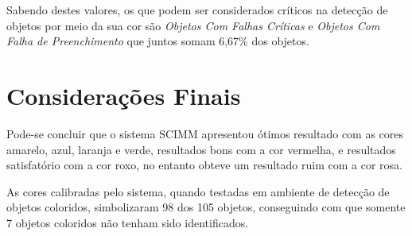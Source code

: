 	
	Sabendo destes valores, os que podem ser considerados críticos na detecção de objetos por meio da sua cor são \textit{Objetos Com Falhas Críticas} e \textit{Objetos Com Falha de Preenchimento} que juntos somam 6,67\% dos objetos.
	
	\section{Considerações Finais}
	
	Pode-se concluir que o sistema SCIMM apresentou ótimos resultado com as cores amarelo, azul, laranja e verde, resultados bons com a cor vermelha, e resultados satisfatório com a cor roxo, no entanto obteve um resultado ruim com a cor rosa. 
	
	As cores calibradas pelo sistema, quando testadas em ambiente de detecção de objetos coloridos, simbolizaram 98 dos 105 objetos, conseguindo com que somente 7 objetos coloridos não tenham sido identificados.